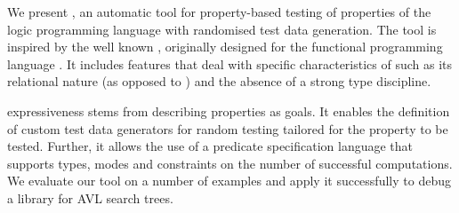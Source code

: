

We present \plqc{}, an automatic tool for property-based
testing of properties of the logic programming language \Prolog{} with
randomised test data generation.
%
The tool is inspired by the well known \QuickCheck, originally designed
for the functional programming language \Haskell{}. It includes features
that deal with specific characteristics of \Prolog{} such as its
relational nature (as opposed to \Haskell{}) and the absence of a strong
type discipline.


\plqc{} expressiveness stems from describing properties as
\Prolog{} goals.
%
It enables the definition of custom test data generators for
random testing tailored for the property to be tested.
%
Further, it allows the use of a predicate specification language that
supports types, modes and constraints on the number of successful
computations.
%
We evaluate our tool on a number of  examples and apply
it successfully to debug a \Prolog{} library for AVL search trees.

